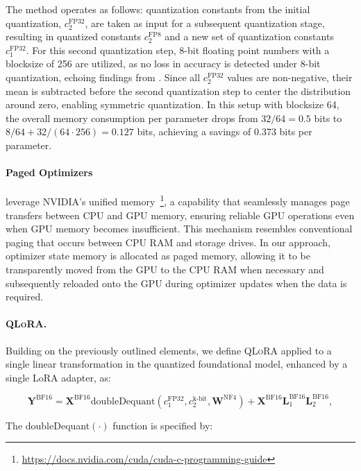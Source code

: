 The method operates as follows: quantization constants from the initial quantization, $c_2^{\text{FP32}}$, are taken as input for a subsequent quantization stage, resulting in quantized constants $c_2^{\text{FP8}}$ and a new set of quantization constants $c_1^{\text{FP32}}$. For this second quantization step, 8-bit floating point numbers with a blocksize of 256 are utilized, as no loss in accuracy is detected under 8-bit quantization, echoing findings from \citet{dettmers2022case}. Since all $c_2^{\text{FP32}}$ values are non-negative, their mean is subtracted before the second quantization step to center the distribution around zero, enabling symmetric quantization. In this setup with blocksize 64, the overall memory consumption per parameter drops from $32/64=0.5$ bits to $8/64 + 32/(64\cdot256) = 0.127$ bits, achieving a savings of 0.373 bits per parameter.

\paragraph{Paged Optimizers} leverage NVIDIA's unified memory~\footnote{\tiny \url{https://docs.nvidia.com/cuda/cuda-c-programming-guide}}, a capability that seamlessly manages page transfers between CPU and GPU memory, ensuring reliable GPU operations even when GPU memory becomes insufficient. This mechanism resembles conventional paging that occurs between CPU RAM and storage drives. In our approach, optimizer state memory is allocated as paged memory, allowing it to be transparently moved from the GPU to the CPU RAM when necessary and subsequently reloaded onto the GPU during optimizer updates when the data is required.

\paragraph{\textsc{QLoRA}.} Building on the previously outlined elements, we define \textsc{QLoRA} applied to a single linear transformation in the quantized foundational model, enhanced by a single LoRA adapter, as:

\begin{equation}
    \mathbf{Y}^{\text{BF16}} =  \mathbf{X}^{\text{BF16}} \text{doubleDequant}(c_1^{\text{FP32}}, c_2^{\text{k-bit}}, \mathbf{W}^{\text{NF4}}) + \mathbf{X}^{\text{BF16}}\mathbf{L}^{\text{BF16}}_1\mathbf{L}^{\text{BF16}}_2,
\end{equation}

The doubleDequant$(\cdot)$ function is specified by:

